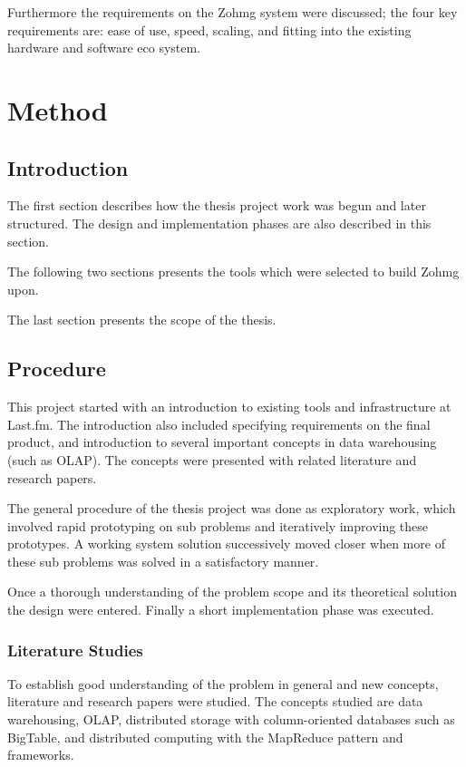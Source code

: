 Furthermore the requirements on the Zohmg system were discussed; the four key
requirements are: ease of use, speed, scaling, and fitting into the existing
hardware and software eco system.



\chapter{Method}



\section*{Introduction}

The first section describes how the thesis project work was begun and later
structured. The design and implementation phases are also described in this
section.

The following two sections presents the tools which were selected to build Zohmg
upon.

The last section presents the scope of the thesis.


\section{Procedure}

This project started with an introduction to existing tools and infrastructure
at Last.fm. The introduction also included specifying requirements on the final
product, and introduction to several important concepts in data warehousing
(such as OLAP). The concepts were presented with related literature and research
papers.

The general procedure of the thesis project was done as exploratory work, which
involved rapid prototyping on sub problems and iteratively improving these
prototypes. A working system solution successively moved closer when more of
these sub problems was solved in a satisfactory manner.

Once a thorough understanding of the problem scope and its theoretical solution
the design were entered. Finally a short implementation phase was executed.


\subsection*{Literature Studies}

To establish good understanding of the problem in general and new concepts,
literature and research papers were studied. The concepts studied are data
warehousing, OLAP, distributed storage with column-oriented databases such
as BigTable, and distributed computing with the MapReduce pattern and
frameworks.

